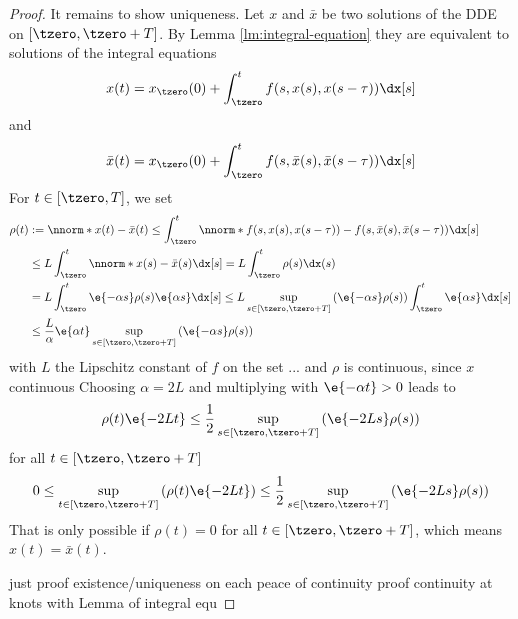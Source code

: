 \begin{proof}
        It remains to show uniqueness.
        Let $x$ and $\bar{x}$ be two solutions of the DDE on $[\tzero,\tzero+T]$.
        By Lemma \ref{lm:integral-equation} they are equivalent to solutions of the integral equations
        \begin{equation}
            x(t) = x_\tzero(0) + \int_\tzero^t f(s,x(s),x(s-\tau))\dx[s]
        \end{equation}
        and
        \begin{equation}
            \bar{x}(t) = x_\tzero(0) + \int_\tzero^t f(s,\bar{x}(s),\bar{x}(s-\tau))\dx[s]
        \end{equation}
        For $t\in [\tzero,T]$, we set
        \begin{align*}
            \rho(t) &:= \nnorm*{x(t)-\bar{x}(t)} \leq \int_\tzero^t \nnorm*{f(s,x(s),x(s-\tau))-f(s,\bar{x}(s),\bar{x}(s-\tau))}\dx[s]\\
            & \leq L \int_\tzero^t \nnorm*{x(s)-\bar{x}(s)}\dx[s] = L \int_\tzero^t \rho(s)\dx(s)\\
            &= L \int_\tzero^t \e{-\alpha s}\rho(s)\e{\alpha s}\dx[s] \leq L \sup_{s\in [\tzero,\tzero+T]}\left(\e{-\alpha s}\rho(s)\right)\int_\tzero^t \e{\alpha s}\dx[s]\\
            & \leq\frac{L}{\alpha}\e{\alpha t} \sup_{s\in [\tzero,\tzero+T]}\left(\e{-\alpha s}\rho(s)\right)
        \end{align*}
        with $L$ the Lipschitz constant of $f$ on the set ...
        and $\rho$ is continuous, since $x$ continuous
        Choosing $\alpha=2L$ and multiplying with $\e{-\alpha t}>0$ leads to
        \begin{equation}
            \rho(t)\e{-2Lt} \leq \frac{1}{2}\sup_{s\in [\tzero,\tzero+T]}\left(\e{-2L s}\rho(s)\right)
        \end{equation}
        for all $t\in [\tzero,\tzero+T]$
        \begin{equation}
            0 \leq \sup_{t\in [\tzero,\tzero+T]}\left(\rho(t)\e{-2Lt}\right) \leq \frac{1}{2}\sup_{s\in [\tzero,\tzero+T]}\left(\e{-2L s}\rho(s)\right)
        \end{equation}
        That is only possible if $\rho(t)=0$ for all $t\in [\tzero,\tzero+T]$, which means $x(t)=\bar{x}(t)$.

        just proof existence/uniqueness on each peace of continuity proof continuity at knots with Lemma of integral equ

    \end{proof}

